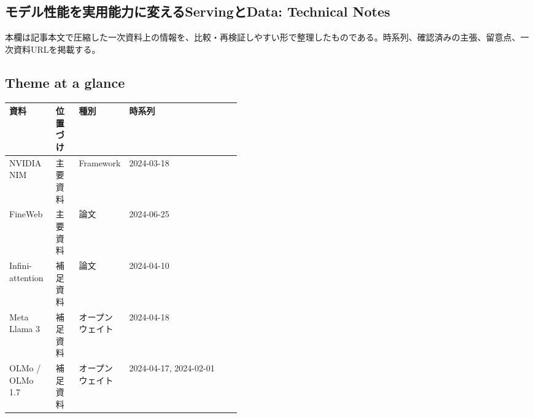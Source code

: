 \subsection*{モデル性能を実用能力に変えるServingとData: Technical Notes}
本欄は記事本文で圧縮した一次資料上の情報を、比較・再検証しやすい形で整理したものである。時系列、確認済みの主張、留意点、一次資料URLを掲載する。
\smallskip
{}\par
\medskip
\subsection*{Theme at a glance}
\begin{center}
\footnotesize
\begin{tabularx}{\linewidth}{@{}p{0.20\linewidth}p{0.10\linewidth}p{0.14\linewidth}X@{}}
\toprule
資料 & 位置づけ & 種別 & 時系列 \\
\midrule
NVIDIA NIM & 主要資料 & Framework & 2024-03-18     \\
FineWeb & 主要資料 & 論文 & 2024-06-25     \\
Infini-attention & 補足資料 & 論文 & 2024-04-10     \\
Meta Llama 3 & 補足資料 & オープンウェイト & 2024-04-18     \\
OLMo / OLMo 1.7 & 補足資料 & オープンウェイト & 2024-04-17, 2024-02-01     \\
\bottomrule
\end{tabularx}
\end{center}
\normalsize


